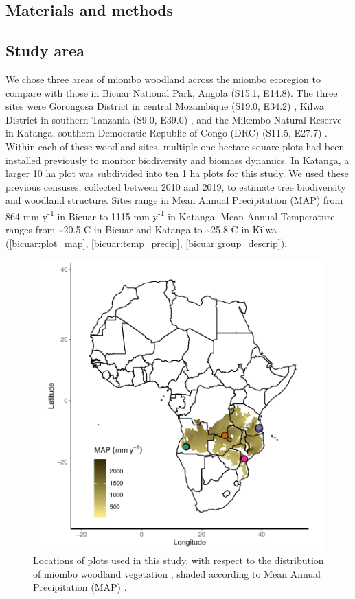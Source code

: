 \begin{refsection}
\section{Materials and methods}
\label{bicuar:sec:methods}

\subsection{Study area}
\label{bicuar:ssec:plot_loc}

We chose three areas of miombo woodland across the miombo ecoregion to compare with those in Bicuar National Park, Angola (S15.1\textdegree, E14.8\textdegree). The three sites were Gorongosa District in central Mozambique (S19.0\textdegree, E34.2\textdegree) \citep{Ryan2011}, Kilwa District in southern Tanzania (S9.0\textdegree, E39.0\textdegree) \citep{McNicol2018a}, and the Mikembo Natural Reserve in Katanga, southern Democratic Republic of Congo (DRC) (S11.5\textdegree, E27.7\textdegree) \citep{Muledi2017}. Within each of these woodland sites, multiple one hectare square plots had been installed previously to monitor biodiversity and biomass dynamics. In Katanga, a larger 10 ha plot was subdivided into ten 1 ha plots for this study. We used these previous censuses, collected between 2010 and 2019, to estimate tree biodiversity and woodland structure. Sites range in Mean Annual Precipitation (MAP) from 864 mm y\textsuperscript{-1} in Bicuar to 1115 mm y\textsuperscript{-1} in Katanga. Mean Annual Temperature ranges from \textasciitilde{}20.5 \textdegree{}C in Bicuar and Katanga to \textasciitilde{}25.8 \textdegree{}C in Kilwa (\autoref{bicuar:plot_map}, \autoref{bicuar:temp_precip}, \autoref{bicuar:group_descrip}).

\begin{figure}
	\includegraphics[width=0.8\linewidth]{img/plot_map}
	\caption[Plot locations within miombo ecoregion]{Locations of plots used in this study, with respect to the distribution of miombo woodland vegetation \citep{White1983}, shaded according to Mean Annual Precipitation (MAP) \citep{Fick2017}.}
	\label{bicuar:plot_map}
\end{figure}


\end{refsection}
